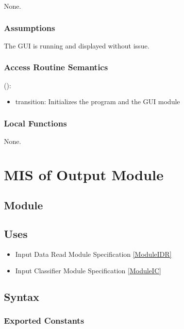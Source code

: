 \documentclass[12pt, titlepage]{article}
\begin{document}
None.

\subsubsection{Assumptions}

The GUI is running and displayed without issue.

\subsubsection{Access Routine Semantics}

\noindent {}():
\begin{itemize}
  \item transition: Initializes the program and the GUI module 
\end{itemize}

\subsubsection{Local Functions}

None.

\section{MIS of Output Module} \label{ModuleO} 


\subsection{Module}


\subsection{Uses}

\begin{itemize}
  \item Input Data Read Module Specification \ref{ModuleIDR}
  \item Input Classifier Module Specification \ref{ModuleIC}
\end{itemize}

\subsection{Syntax}

\subsubsection{Exported Constants}
\end{document}
